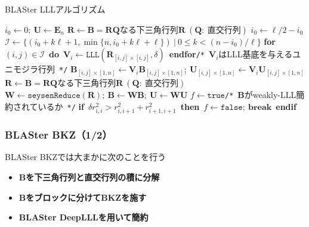 \documentclass[12pt,aspectratio=169,table,dvipdfmx, leqno]{beamer}
\renewcommand{\Comment}[1]{\quad\texttt{/*}~#1~\texttt{*/}}
\begin{document}
\begin{frame}%
\begin{algorithm}[H]
    \footnotesize
    \begin{algorithmic}[1]
        \caption{\footnotesize BLASter LLLアルゴリズム\cite{DPS25}}
        \label{alg_blaster_lll}
        \State $i_0\gets 0;~\bm{U}\gets \bm{E}_n$
        \Do
            \State $\bm{R}\gets \bm{B}=\bm{RQ}$なる下三角行列$\bm{R}~(\bm{Q}:~\text{直交行列})$
            \State $i_0\gets \ell/2-i_0$
            \State $\mathcal{I}\gets \{(i_0+k\ell+1, \min\{n, i_0+k\ell+\ell\})~|~0\le k<(n-i_0)/\ell\}$
            \State \textbf{for}~$(i, j)\in\mathcal{I}$~\textbf{do}~$\bm{V}_i\gets \texttt{LLL}(\bm{R}_{[i, j]\times [i, j]}, \delta)$~\textbf{endfor}\Comment{$\bm{V}_i$はLLL基底を与えるユニモジラ行列}
                \State $\bm{B}_{[i, j]\times [1, n]}\gets \bm{V}_i\bm{B}_{[i, j]\times [1, n]};~\bm{U}_{[i, j]\times [1, n]}\gets \bm{V}_i\bm{U}_{[i, j]\times [1, n]}$
            \EndFor
            \State $\bm{R}\gets \bm{B}=\bm{RQ}$なる下三角行列$\bm{R}~(\bm{Q}:~\text{直交行列})$
            \State $\bm{W}\gets \texttt{seysenReduce}(\bm{R});~\bm{B}\gets\bm{WB};~\bm{U}\gets\bm{WU}$
            \State $f\gets \texttt{true}$\Comment{$\bm{B}$がweakly-LLL簡約されているか}
                \State \textbf{if}~$\delta r_{i, i}^2> r_{i, i+1}^2+r_{i+1, i+1}^2$~\textbf{then}~$f\gets\texttt{false};~\textbf{break}$~\textbf{endif}
            \EndFor
    \end{algorithmic}
\end{algorithm}
\end{frame}

\begin{frame}
    \frametitle{BLASter BKZ（1/2）}

    BLASter BKZでは大まかに次のことを行う
    \begin{itemize}
        \item \textbf{$\bm{B}$を下三角行列と直交行列の積に分解}
        \item \textbf{$\bm{B}$をブロックに分けてBKZを施す}
        \item \textbf{BLASter DeepLLLを用いて簡約}
    \end{itemize}
\end{frame}
\end{document}
